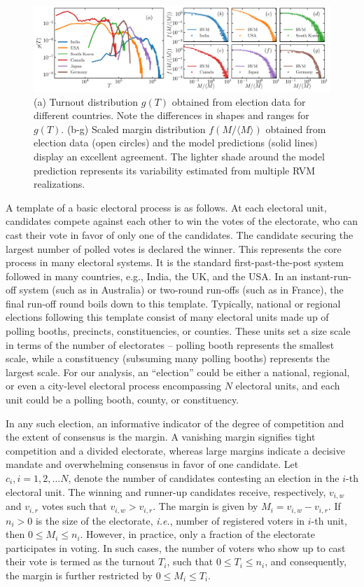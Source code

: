 \documentclass[reprint,aps,prl,showpacs,twocolumn, superscriptaddress]{revtex4-2}
\begin{document}
\begin{figure}[t!]
    \centering
    \includegraphics[width=\textwidth]{fig_1.pdf}
    \caption{(a) Turnout distribution $g(T)$ obtained from election data for different countries. Note the differences in shapes and ranges for $g(T)$. (b-g) Scaled margin distribution $f(M/\langle M \rangle)$ obtained from election data (open circles) and the model predictions (solid lines) display an excellent agreement. The lighter shade around the model prediction represents its variability estimated from multiple RVM realizations.}
    \label{fig_1}
\end{figure}
A template of a basic electoral process is as follows. At each electoral unit, candidates compete against each other to win the votes of the electorate, who can cast their vote in favor of only one of the candidates. The candidate securing the largest number of polled votes is declared the winner. This represents the core process in many electoral systems. It is the standard first-past-the-post system followed in many countries, e.g., India, the UK, and the USA. In an instant-run-off system (such as in Australia) or two-round run-offs (such as in France), the final run-off round boils down to this template. Typically, national or regional elections following this template consist of many electoral units made up of polling booths, precincts, constituencies, or counties. These units set a size scale in terms of the number of electorates -- polling booth represents the smallest scale, while a constituency (subsuming many polling booths) represents the largest scale. For our analysis, an ``election'' could be either a national, regional, or even a city-level electoral process encompassing $N$ electoral units, and each unit could be a polling booth, county, or constituency.

In any such election, an informative indicator of the degree of competition and the extent of consensus is the margin. A vanishing margin signifies tight competition and a divided electorate, whereas large margins indicate a decisive mandate and overwhelming consensus in favor of one candidate. Let $c_i, i=1, 2, \dots N$, denote the number of candidates contesting an election in the $i$-th electoral unit. The winning and runner-up candidates receive, respectively, $v_{i, w}$ and $v_{i, r}$ votes such that $v_{i, w} > v_{i, r}$. The margin is given by $M_i=v_{i, w}-v_{i, r}$. If $n_i > 0$ is the size of the electorate, {\it i.e.}, number of registered voters in $i$-th unit, then $0 \le M_i \le n_i$. However, in practice, only a fraction of the electorate participates in voting. In such cases, the number of voters who show up to cast their vote is termed as the turnout $T_i$, such that $0 \le T_i \le n_i$, and consequently, the margin is further restricted by $0 \le M_i \le T_i$.
\end{document}

